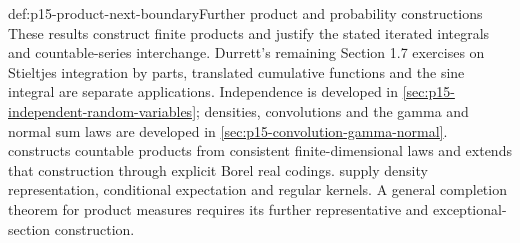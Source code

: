 \begin{proofboundary}{def:p15-product-next-boundary}{Further product and probability constructions}
These results construct finite products and justify the stated iterated
integrals and countable-series interchange. Durrett's remaining
Section 1.7 exercises on Stieltjes integration by parts, translated
cumulative functions and the sine integral are separate applications.
Independence is developed in
\cref{sec:p15-independent-random-variables}; densities, convolutions
and the gamma and normal sum laws are developed in
\cref{sec:p15-convolution-gamma-normal}.
 constructs countable products
from consistent finite-dimensional laws and extends that construction
through explicit Borel real codings.
supply density representation, conditional expectation and regular kernels.
A general completion theorem for product measures requires its further
representative and exceptional-section construction.
\end{proofboundary}
